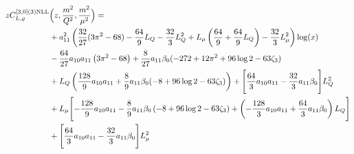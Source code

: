 \documentclass[a4paper]{article}
\begin{document}
\begin{equation}
	\begin{split}
		z C_{L,g}^{[3, 0](3) \rm NLL}&\Bigl(z,\frac{m^2}{Q^2},\frac{m^2}{\mu^2}\Bigr)= \\
		& + a_{11}^2 \left(\frac{32}{27} (3 \pi^2 - 68) - \frac{64}{9} L_Q - \frac{32}{3} L_Q^2 + L_\mu \left(\frac{64}{9} + \frac{64}{9} L_Q\right)- \frac{32}{3} L_\mu^2\right) \log(x) \\
		& -\frac{64}{27} a_{10} a_{11} \left(3 \pi^2 - 68\right) + \frac{8}{27} a_{11} \beta_0 (-272 + 12 \pi^2 + 96 \log 2 - 63 \zeta_3) \\
		& + L_Q \left(\frac{128}{9} a_{10} a_{11} + \frac{8}{9} a_{11} \beta_0 (-8 + 96 \log 2 - 63 \zeta_3)\right) + \Biggl[ \frac{64}{3} a_{10} a_{11} - \frac{32}{3} a_{11} \beta_0\Biggr] L_Q^2 \\
		& + L_\mu \Biggl[- \frac{128}{9} a_{10} a_{11} - \frac{8}{9} a_{11} \beta_0 \left(-8 + 96 \log 2 - 63 \zeta_3\right) + \left(- \frac{128}{3} a_{10} a_{11} + \frac{64}{3} a_{11} \beta_0 \right) L_Q \Biggr] \\
		& + \Biggl[\frac{64}{3} a_{10} a_{11} - \frac{32}{3} a_{11} \beta_0 \Biggr] L_\mu^2
	\end{split}
\end{equation}
\end{document}
